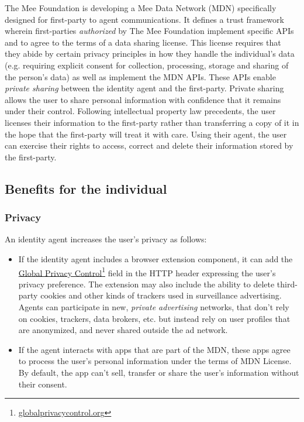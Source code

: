 \documentclass[11pt, oneside]{article}   	%
\newcommand{\hyperfootnote}[1][]{\def\ArgI{{#1}}\hyperfootnoteRelay}
\newcommand\hyperfootnoteRelay[2][]{\href{#1#2}{\ArgI}\footnote{\href{#1#2}{#2}}}
\begin{document}
The Mee Foundation is developing a Mee Data Network (MDN) specifically designed for first-party to agent communications. It defines a trust framework wherein first-parties \emph{authorized} by The Mee Foundation implement specific APIs and to agree to the terms of a data sharing license. This license requires that they abide by certain privacy principles in how they handle the individual's data (e.g. requiring explicit consent for collection, processing, storage and sharing of the person's data) as well as implement the MDN APIs. These APIs enable \emph{private sharing} between the identity agent and the first-party. Private sharing allows the user to share personal information with confidence that it remains under their control. Following intellectual property law precedents, the user licenses their information to the first-party rather than transferring a copy of it in the hope that the first-party will treat it with care. Using their agent, the user can exercise their rights to access, correct and delete their information stored by the first-party.

\subsection{Benefits for the individual}

\subsubsection{Privacy}

An identity agent increases the user's privacy as follows:
\begin{itemize}
	\item If the identity agent includes a browser extension component, it can add the \hyperfootnote[Global Privacy Control][https://]{globalprivacycontrol.org} field in the HTTP header expressing the user's privacy preference. The extension may also include the ability to delete third-party cookies and other kinds of trackers used in surveillance advertising. Agents can participate in new, \emph{private advertising} networks, that don't rely on cookies, trackers, data brokers, etc. but instead rely on user profiles that are anonymized, and never shared outside the ad network. 
	\item If the agent interacts with apps that are part of the MDN, these apps agree to process the user's personal information under the terms of MDN License. By default, the app can't sell, transfer or share the user's information without their consent. 
\end{itemize}
\end{document}
